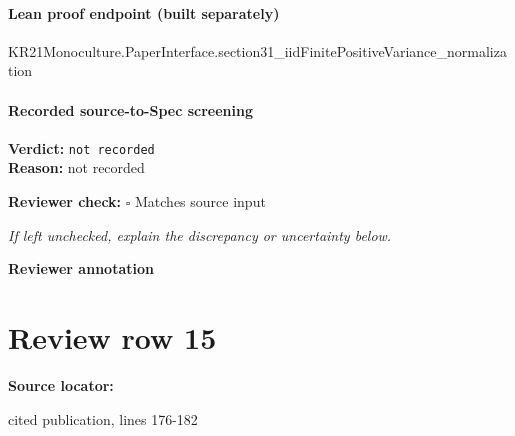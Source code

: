 \documentclass[10pt]{article}
\newcommand{\reviewerbox}{%
  \par\noindent\fbox{\parbox{0.96\linewidth}{\rule{0pt}{0.38in}}}\par
}
\newcommand{\reviewmatch}[1]{%
  \par\noindent\textbf{Reviewer check:} $\square$\; #1\par
  \noindent\emph{If left unchecked, explain the discrepancy or uncertainty below.}\par
}
\begin{document}
\paragraph{Lean proof endpoint (built separately)}\begin{ReviewVerbatim}
KR21Monoculture.PaperInterface.section31_iidFinitePositiveVariance_normalization
\end{ReviewVerbatim}

\paragraph{Recorded source-to-Spec screening}
\textbf{Verdict:} \texttt{not recorded}
\\
\textbf{Reason:} not recorded
\reviewmatch{Matches source input}
\noindent\textbf{Reviewer annotation}\par
\reviewerbox
\clearpage
\hypertarget{source-claim-cc8111af16950cc8}{}
\section*{Review row 15}
\textbf{Source locator:} {\footnotesize\raggedright cited publication, lines 176-\allowbreak{}182\par}
\end{document}
